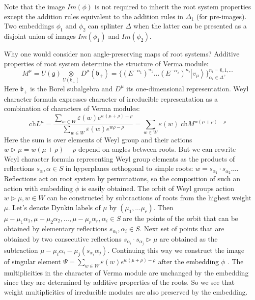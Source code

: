 \documentclass{article}
\newcommand{\gf}{\mathfrak{g}}
\newcommand{\bff}{\mathfrak{b}}
\begin{document}
Note that the image $Im(\phi)$ is not required to inherit the root system
properties except the addition rules equivalent to the addition
rules in $\Delta_{1}$ (for pre-images). Two embeddings $\phi_1$ and $\phi_2$  
can splinter $\Delta$  when the latter can be presented 
as a disjoint union of images $Im(\phi_1)$ and $Im(\phi_2)$. 

Why one would consider non angle-preserving maps of root systems? Additive properties of root system
determine the structure of Verma module:
    \begin{equation*}
      M^{\mu}=U(\gf)\underset{U(\bff_{+})}{\otimes} D^{\mu}(\bff_{+})=\{(E^{-\alpha_{1}})^{n_{1}}\dots (E^{-\alpha_{s}})^{n_{s}} \left|v_{\mu}\right>\}_{\alpha_{i}\in\Delta^{+}}^{n_{i}=0,1,\dots}
    \end{equation*}
Here $\bff_{+}$ is the Borel subalgebra and $D^{\mu}$ its one-dimensional representation. 
Weyl character formula expresses character of irreducible representation as a combination of
characters of Verma modules: 
\begin{equation*}
  \mathrm{ch} L^{\mu}=\frac{\sum_{w\in W} \varepsilon(w) e^{w(\mu+\rho)-\rho}}{\sum_{w\in W}\varepsilon(w) e^{w\rho-\rho}}=\sum_{w\in W} \varepsilon(w)\; \mathrm{ch} M^{w(\mu+\rho)-\rho}
\end{equation*}
Here the sum is over elements of Weyl group and their actions $w\triangleright \mu
=w(\mu+\rho)-\rho$ depend on angles between roots. But we can rewrite Weyl character formula
representing Weyl group elements as the products of reflections $s_{\alpha}, \alpha \in S$ in
hyperplanes orthogonal to simple roots: $w=s_{\alpha_{1}}\cdot s_{\alpha_{2}}\dots$. Reflections act
on root system by permutations, so the composition of such an action with embedding $\phi$ is easily
obtained. The orbit of Weyl groups action $w\triangleright \mu, w\in W$ can be constructed by
subtractions of roots from the highest weight $\mu$. Let's denote Dynkin labels of $\mu$ by
$(\mu_{1},\dots \mu_{r})$. Then $\mu-\mu_{1}\alpha_{1}, \mu-\mu_{2}\alpha_{2},\dots,
\mu-\mu_{r}\alpha_{r}, \alpha_{i}\in S$ are the points of the orbit that can be obtained by
elementary reflections $s_{\alpha_{i}}, \alpha_{i}\in S$. Next set of points that are obtained by
two consecutive reflections $s_{\alpha_{i}}\cdot s_{\alpha_{j}}\triangleright\mu$ are obtained as
the subtraction $\mu-\mu_{i}\alpha_{i}-\mu_{j} (s_{\alpha_{i}}\alpha_{j})$. Continuing this way we
construct the image of singular element $\Psi=\sum_{w\in W} \varepsilon(w) e^{w(\mu+\rho)-\rho}$
after the embedding $\phi$ \cite{2011arXiv1111.6787L}. The multiplicities in the character of Verma
module are unchanged by the embedding since they are determined by additive properties of the roots.
So we see that weight multiplicities of irreducible modules are also preserved by the embedding.
\end{document}
